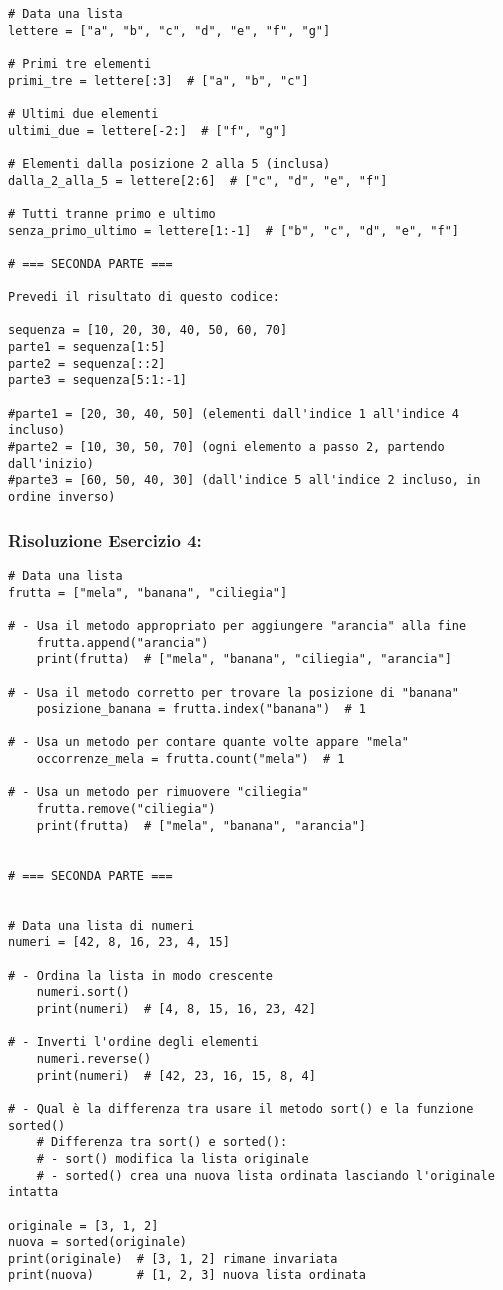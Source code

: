 \begin{lstlisting}
# Data una lista
lettere = ["a", "b", "c", "d", "e", "f", "g"]

# Primi tre elementi
primi_tre = lettere[:3]  # ["a", "b", "c"]

# Ultimi due elementi
ultimi_due = lettere[-2:]  # ["f", "g"]

# Elementi dalla posizione 2 alla 5 (inclusa)
dalla_2_alla_5 = lettere[2:6]  # ["c", "d", "e", "f"]

# Tutti tranne primo e ultimo
senza_primo_ultimo = lettere[1:-1]  # ["b", "c", "d", "e", "f"]

# === SECONDA PARTE ===

Prevedi il risultato di questo codice:

sequenza = [10, 20, 30, 40, 50, 60, 70]
parte1 = sequenza[1:5]
parte2 = sequenza[::2]
parte3 = sequenza[5:1:-1]

#parte1 = [20, 30, 40, 50] (elementi dall'indice 1 all'indice 4 incluso)
#parte2 = [10, 30, 50, 70] (ogni elemento a passo 2, partendo dall'inizio)
#parte3 = [60, 50, 40, 30] (dall'indice 5 all'indice 2 incluso, in ordine inverso)
\end{lstlisting}

\subsubsection{Risoluzione Esercizio 4: }

\begin{lstlisting}
# Data una lista
frutta = ["mela", "banana", "ciliegia"]

# - Usa il metodo appropriato per aggiungere "arancia" alla fine
    frutta.append("arancia")
    print(frutta)  # ["mela", "banana", "ciliegia", "arancia"]
    
# - Usa il metodo corretto per trovare la posizione di "banana"
    posizione_banana = frutta.index("banana")  # 1
    
# - Usa un metodo per contare quante volte appare "mela"
    occorrenze_mela = frutta.count("mela")  # 1
    
# - Usa un metodo per rimuovere "ciliegia"
    frutta.remove("ciliegia")
    print(frutta)  # ["mela", "banana", "arancia"]


# === SECONDA PARTE ===


# Data una lista di numeri
numeri = [42, 8, 16, 23, 4, 15]

# - Ordina la lista in modo crescente
    numeri.sort()
    print(numeri)  # [4, 8, 15, 16, 23, 42]
    
# - Inverti l'ordine degli elementi
    numeri.reverse()
    print(numeri)  # [42, 23, 16, 15, 8, 4]
    
# - Qual è la differenza tra usare il metodo sort() e la funzione sorted()
    # Differenza tra sort() e sorted():
    # - sort() modifica la lista originale
    # - sorted() crea una nuova lista ordinata lasciando l'originale intatta

originale = [3, 1, 2]
nuova = sorted(originale)
print(originale)  # [3, 1, 2] rimane invariata
print(nuova)      # [1, 2, 3] nuova lista ordinata
\end{lstlisting}


